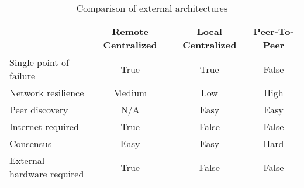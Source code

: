 \begin{table}
\centering
\begin{tabularx}{\textwidth}{Xccc}\toprule
                                        & Remote Centralized    & Local Centralized     & Peer-To-Peer      \\\midrule
    Single point of failure             & True                  & True                  & False             \\
    Network resilience                  & Medium                & Low                   & High              \\
    Peer discovery                      & N/A                   & Easy                  & Easy              \\
    Internet required                   & True                  & False                 & False             \\
    Consensus                           & Easy                  & Easy                  & Hard              \\
    External hardware required          & True                  & False                 & False             \\\bottomrule
\end{tabularx}
\caption{Comparison of external architectures}
\label{tbl:external_comparison}
\end{table}
